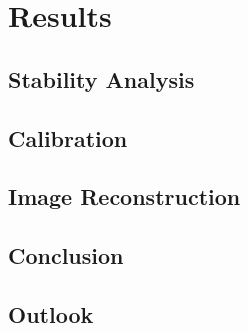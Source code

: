 \chapter{Results}
\section{Stability Analysis}
\section{Calibration}
\section{Image Reconstruction}
\section{Conclusion}
\section{Outlook}